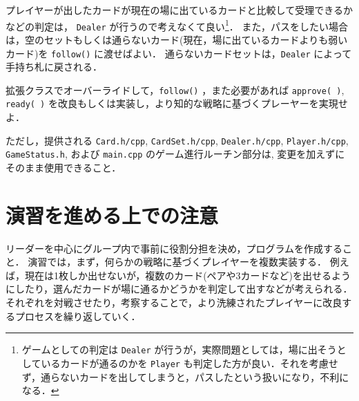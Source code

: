 プレイヤーが出したカードが現在の場に出ているカードと比較して受理できるかなどの判定は， \verb+Dealer+ が行うので考えなくて良い\footnote{ゲームとしての判定は \verb+Dealer+ が行うが，実際問題としては，場に出そうとしているカードが通るのかを \verb+Player+ も判定した方が良い．それを考慮せず，通らないカードを出してしまうと，パスしたという扱いになり，不利になる．}．
また，パスをしたい場合は，空のセットもしくは通らないカード(現在，場に出ているカードよりも弱いカード)を \verb+follow()+ に渡せばよい．
通らないカードセットは，\verb+Dealer+ によって手持ち札に戻される．
 
\begin{exerc}
拡張クラスでオーバーライドして，\verb+follow()+ ，また必要があれば \verb+approve( )+, \verb+ready( )+ を改良もしくは実装し，より知的な戦略に基づくプレーヤーを実現せよ．

ただし，提供される \verb+Card.h/cpp+, \verb+CardSet.h/cpp+, \verb+Dealer.h/cpp+, \verb+Player.h/cpp+, \verb+GameStatus.h+, および \verb+main.cpp+ のゲーム進行ルーチン部分は, 変更を加えずにそのまま使用できること．
\end{exerc}

\section{演習を進める上での注意}
リーダーを中心にグループ内で事前に役割分担を決め，プログラムを作成すること．
演習では，まず，何らかの戦略に基づくプレイヤーを複数実装する．
例えば，現在は1枚しか出せないが，複数のカード(ペアや3カードなど)を出せるようにしたり，選んだカードが場に通るかどうかを判定して出すなどが考えられる．
それぞれを対戦させたり，考察することで，より洗練されたプレイヤーに改良するプロセスを繰り返していく．

